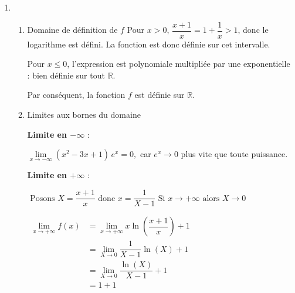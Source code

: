 \documentclass[12pt,a4paper]{article}
\begin{document}
\begin{enumerate}
    \item
          \begin{enumerate}
              \item Domaine de définition de \( f \)
                    Pour \( x > 0 \), \( \dfrac{x+1}{x} = 1 + \dfrac{1}{x} > 1 \), donc le logarithme est défini. La fonction est donc définie sur cet intervalle.

                    Pour \( x \leq 0 \), l'expression est polynomiale multipliée par une exponentielle : bien définie sur tout \( \mathbb{R} \).

                    Par conséquent, la fonction \( f \) est définie sur \( \mathbb{R} \).

              \item Limites aux bornes du domaine

                    \textbf{Limite en \( -\infty \)} :

                    \( \lim\limits_{x \to -\infty} (x^2 - 3x + 1)\, e^x = 0, \)
                    car \( e^x \to 0 \) plus vite que toute puissance.

                    \textbf{Limite en \( +\infty \)} :

                    \(\text{ Posons } X=\dfrac{x+1}{x} \text{ donc } x=\dfrac{1}{X-1} \text{ Si } x\to +\infty \text{ alors } X \to 0\)

                    \(
                    \begin{aligned}
                        \lim\limits_{x \to +\infty}f(x) & =\lim\limits_{x \to +\infty}x \ln\left( \dfrac{x+1}{x} \right) + 1 \\
                                                        & =\lim\limits_{X \to 0}\dfrac{1}{X-1} \ln\left( X \right) + 1       \\
                                                        & =\lim\limits_{X \to 0}\dfrac{\ln\left( X \right)}{X-1}  + 1        \\
                                                        & =1  + 1                                                            \\
                    \end{aligned}
                    \)


\end{enumerate}
\end{enumerate}
\end{document}
